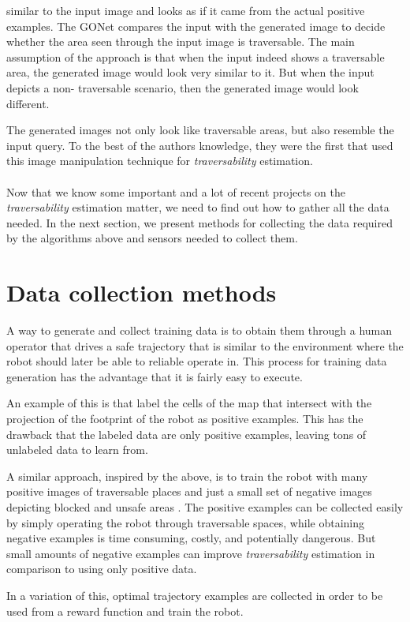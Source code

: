 \documentclass[12pt,a4paper]{report}
\newcommand{\term}{\textit}
\begin{document}
	similar to the input image and looks as if it came from the actual positive 
	examples. The GONet compares the input with the generated image to decide whether 
	the area seen through the input image is traversable. The main assumption of 
	the approach is that when the input indeed shows a traversable area, the 
	generated image would look very similar to it. But when the input depicts a non-
	traversable scenario, then the generated image would look different.
	\par
	The generated images not only look like	traversable areas, but also resemble the 
	input query. To the best of the authors knowledge, they were the first that used 
	this image manipulation technique for \term{traversability} estimation.
	\\\\
	
	
	Now that we know some important and a lot of recent projects on the 
	\term{traversability} estimation matter, we need to find out how to gather all 
	the data needed. In the next section, we present methods for collecting the data 
	required by the algorithms above and sensors needed to collect them.
	\\
	
	\section{Data collection methods}
	\label{sec:bg:data}
	
	A way to generate and collect training data is to obtain them through a human 
	operator that drives a safe trajectory that is similar to the environment where 
	the robot should later be able to reliable operate in. This process for training 
	data generation has the advantage that it is fairly easy to execute.
	\par 
	An example of this is \cite{Suger} that label the cells of the map that 
	intersect with the projection of the footprint of the robot as positive examples. 
	This has the drawback that the labeled data are only positive examples, leaving 
	tons of unlabeled data to learn from.
	\par
	A similar approach, inspired by the above, is to train the robot with many 
	positive images of traversable places and just a small set of negative images 
	depicting blocked and unsafe areas \cite{HiroseGonet}. The positive examples can 
	be collected easily by simply operating the robot through traversable spaces, 
	while obtaining negative examples is time consuming, costly, and potentially 
	dangerous. But small amounts of negative examples can improve \term{traversability} 
	estimation in comparison to using only positive data.
	\par 
	In a variation of this, optimal trajectory examples are collected \cite{Wigness} 
	in order to be used from a reward function and train the robot.
	\\
	
\end{document}
